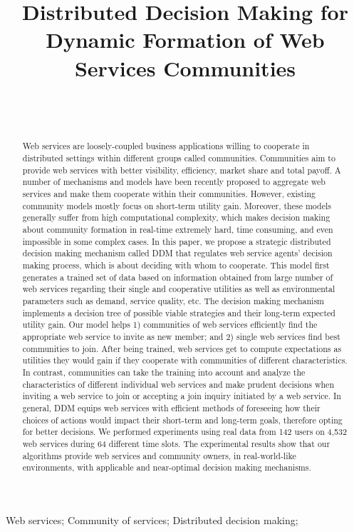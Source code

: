 \documentclass[11pt,onecolumn]{IEEEtran}
\author{
    \IEEEauthorblockN{\normalsize Ehsan Khosrowshahi Asl\IEEEauthorrefmark{1}, Babak Khosravifar\IEEEauthorrefmark{1}, Jamal Bentahar\IEEEauthorrefmark{1}, Hadi Otrok\IEEEauthorrefmark{2}, Rabeb Mizouni\IEEEauthorrefmark{2}}\\
    \IEEEauthorblockA{\IEEEauthorrefmark{1}Concordia Institute for Information Systems Engineering, Concordia University, Montreal, Canada}
    \\
    \IEEEauthorblockA{\IEEEauthorrefmark{2}Department of Electrical and Computer Engineering, KUSTAR, Abu Dhabi, UAE}
}
\title{Distributed Decision Making for Dynamic Formation of Web Services Communities}
\begin{document}
\maketitle

\begin{abstract}
Web services are loosely-coupled business applications willing to cooperate in distributed settings within different groups called communities. Communities aim to provide web services with better visibility, efficiency, market share and total payoff. A number of mechanisms and models have been recently proposed to aggregate web
services and make them cooperate within their communities. However, existing community models mostly focus on short-term utility gain. Moreover, these models generally suffer from high computational complexity, which makes decision making about community formation in real-time extremely hard, time consuming, and even impossible in some complex cases. In this paper, we propose a strategic distributed decision making mechanism called DDM that regulates web service agents' decision making process, which is about deciding with whom to cooperate. This model first generates a trained set of data based on information obtained from large number of web services regarding their single and cooperative utilities as well as environmental parameters such as demand, service quality, etc. The decision making mechanism implements a decision tree of possible viable strategies and their long-term expected utility gain.
Our model helps 1) communities of web services efficiently find the appropriate web service to invite as new member; and 2) single web services find best communities to join. After being trained, web services get to compute expectations as utilities they would gain if they cooperate with communities of different characteristics. In contrast, communities can take the training into account and analyze the characteristics of different individual web services and make prudent decisions when inviting a web service to join or accepting a join inquiry initiated by a web service. In general, DDM equips web services with efficient methods of foreseeing how their choices of actions would impact their short-term and long-term goals, therefore opting for better decisions. We performed experiments using real data from 142 users on 4,532 web services during 64 different time slots. The experimental results show that our algorithms provide web services and community owners, in real-world-like environments, with applicable and near-optimal decision making mechanisms.
\end{abstract}
\begin{IEEEkeywords}
Web services; Community of services; Distributed decision making;
\end{IEEEkeywords}
\end{document}
